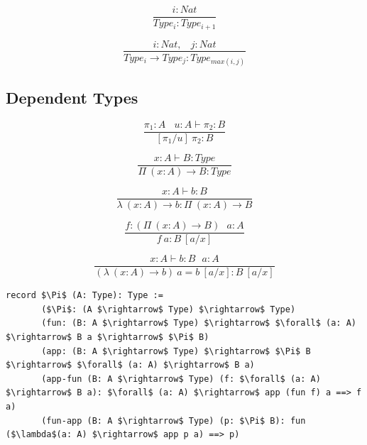 \documentclass[11pt,oneside]{article}
\begin{document}
\begin{equation}
\tag{axioms}
\dfrac
  {i: Nat}
  {Type_i : Type_{i+1}}
\end{equation}

\begin{equation}
\tag{rules}
\dfrac
  {i : Nat,\ \ \ \ j : Nat}
  {Type_i \rightarrow Type_{j} : Type_{max(i,j)}}
\end{equation}

  \subsection{Dependent Types}

\begin{equation}
\tag{subst}
\dfrac
  {\pi_1 : A\ \ \ \ u:A \vdash \pi_2 : B}
  {[\pi_1/u]\ \pi_2 : B}
\end{equation}

\begin{equation}
\tag{$\Pi$-formation}
\dfrac
  {x:A \vdash B : Type}
  {\Pi\ (x:A) \rightarrow B : Type}
\end{equation}

\begin{equation}
\tag{$\lambda$-intro}
\dfrac
  {x:A \vdash b : B}
  {\lambda\ (x:A) \rightarrow b : \Pi\ (x: A) \rightarrow B }
\end{equation}

\begin{equation}
\tag{$App$-elimination}
\dfrac
  {f: (\Pi\ (x:A) \rightarrow B)\ \ \ a: A}
  {f\ a : B\ [a/x]}
\end{equation}

\begin{equation}
\tag{$\beta$-computation}
\dfrac
  {x:A \vdash b: B\ \ \ a:A}
  {(\lambda\ (x:A) \rightarrow b)\ a = b\ [a/x] : B\ [a/x]}
\end{equation}

\newpage

\begin{lstlisting}[mathescape=true]
record $\Pi$ (A: Type): Type :=
       ($\Pi$: (A $\rightarrow$ Type) $\rightarrow$ Type)
       (fun: (B: A $\rightarrow$ Type) $\rightarrow$ $\forall$ (a: A) $\rightarrow$ B a $\rightarrow$ $\Pi$ B)
       (app: (B: A $\rightarrow$ Type) $\rightarrow$ $\Pi$ B $\rightarrow$ $\forall$ (a: A) $\rightarrow$ B a)
       (app-fun (B: A $\rightarrow$ Type) (f: $\forall$ (a: A) $\rightarrow$ B a): $\forall$ (a: A) $\rightarrow$ app (fun f) a ==> f a)
       (fun-app (B: A $\rightarrow$ Type) (p: $\Pi$ B): fun ($\lambda$(a: A) $\rightarrow$ app p a) ==> p)
\end{lstlisting}
\end{document}
